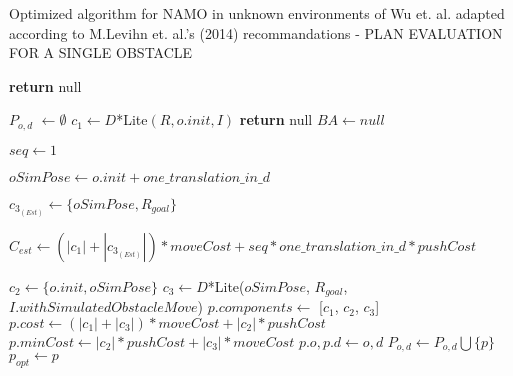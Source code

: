 \begin{algorithm}[H]

  \caption{Optimized algorithm for NAMO in unknown environments of Wu et. al. adapted according to M.Levihn et. al.'s (2014) recommandations - PLAN EVALUATION FOR A SINGLE OBSTACLE}

  \label{alg:02-levihn-planforobstacle}

  \begin{algorithmic}[1]


        \State \textbf{return} null
      \EndIf

      \State $P_{o,d}$ $\gets \emptyset$
      \State $c_{1} \gets D$*Lite$(R, o.init, I)$ 
        \State \textbf{return} null
      \EndIf
      \State $BA \gets null$ 

       

        \State $seq \gets 1$ 

        \State $oSimPose \gets o.init + one\_translation\_in\_d$

        \State $c_{3_{(Est)}} \gets \{oSimPose, R_{goal}\}$

        \State $C_{est} \gets (|c_{1}| + |c_{3_{(Est)}}|) * moveCost + seq * one\_translation\_in\_d * pushCost$


            \State $c_{2} \gets \{o.init, oSimPose\}$
            \State $c_{3} \gets D$*Lite($oSimPose$, $R_{goal}$, $I.withSimulatedObstacleMove$)
              \State $p.components \gets$ [$c_{1}$, $c_{2}$, $c_{3}$]
              \State $p.cost \gets (|c_{1}| + |c_{3}|) * moveCost + |c_{2}| * pushCost$
              \State $p.minCost \gets |c_{2}| * pushCost + |c_{3}| * moveCost$
              \State $p.o, p.d \gets o, d$
              \State $P_{o,d} \gets P_{o,d} \bigcup \{p\}$
                \State $p_{opt} \gets p$
              \EndIf
            \EndIf
          \EndIf


\end{algorithmic}
\end{algorithm}

